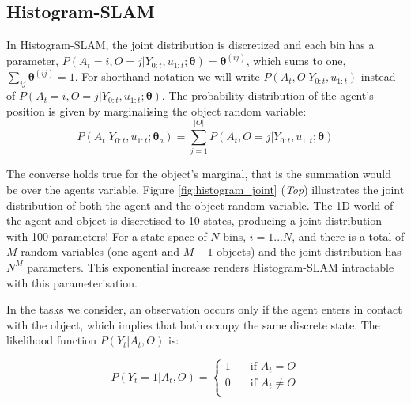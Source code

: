 \documentclass{frontiersSCNS} %
\newcommand{\ThA}{\boldsymbol{\theta}_a}
\begin{document}
\subsection{Histogram-SLAM}\label{sec:Discrete}

In Histogram-SLAM, the joint distribution is discretized and each bin has a parameter, 
${P(A_t=i,O=j|Y_{0:t},u_{1:t};\boldsymbol{\theta}) = \boldsymbol{\theta}^{(ij)}}$, which sums to one, $\sum_{ij} \boldsymbol{\theta}^{(ij)} = 1$. 
For shorthand notation we will write $P(A_t,O|Y_{0:t},u_{1:t})$ instead of $P(A_t=i,O=j|Y_{0:t},u_{1:t};\boldsymbol{\theta})$.
The probability distribution of the agent's position is given by marginalising the object random variable:
\begin{equation}
 P(A_t|Y_{0:t},u_{1:t};\ThA)    = \sum\limits_{j=1}^{|O|} P(A_t,O=j|Y_{0:t},u_{1:t};\boldsymbol{\theta}) \label{eq:agent_marginal}
\end{equation}

The converse holds true for the object's marginal, that is the summation would be over 
the agents variable. Figure \ref{fig:histogram_joint} (\textit{Top}) illustrates the joint distribution of both the agent and the object random variable. 
The 1D world of the agent and object is discretised to 10 states, producing a joint distribution with 100 parameters!
For a state space of $N$ bins, $i=1...N$, and there is a total of $M$ random variables (one agent and $M-1$ objects)
and the joint distribution has $N^{M}$ parameters. This exponential increase renders Histogram-SLAM intractable
with this parameterisation.



In the tasks we consider, an observation occurs only if the agent enters in contact with the object, which implies that both
occupy the same discrete state. The likelihood function $P(Y_t|A_t,O)$ is:

\begin{equation} \label{eq:discrete_likelihoood}
P(Y_t=1|A_t,O) =
  \begin{cases}
    1       & \quad \text{if } A_t = O     \\
    0  	    & \quad \text{if } A_t \not= O \\
  \end{cases}
\end{equation}
\end{document}
